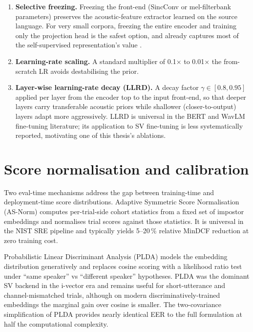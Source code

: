 \begin{enumerate}
    \item \textbf{Selective freezing.} Freezing the front-end
    (SincConv or mel-filterbank parameters) preserves the
    acoustic-feature extractor learned on the source language. For
    very small corpora, freezing the entire encoder and training
    only the projection head is the safest option, and already
    captures most of the self-supervised representation's value
    \cite{chen2022wavlm,sang2025unipet}.
    \item \textbf{Learning-rate scaling.} A standard
    multiplier of 0.1$\times$ to 0.01$\times$ the from-scratch LR
    avoids destabilising the prior.
    \item \textbf{Layer-wise learning-rate decay (LLRD).} A decay
    factor $\gamma \in [0.8, 0.95]$ applied per layer from the
    encoder top to the input front-end, so that deeper layers carry
    transferable acoustic priors while shallower (closer-to-output)
    layers adapt more aggressively. LLRD is universal in the BERT
    and WavLM fine-tuning literature; its application to SV
    fine-tuning is less systematically reported, motivating one of
    this thesis's ablations.
\end{enumerate}


\section{Score normalisation and calibration}
\label{sec:related-scoring}

Two eval-time mechanisms address the gap between training-time and
deployment-time score distributions. Adaptive Symmetric Score
Normalisation (AS-Norm) \cite{matejka2017analysis} computes
per-trial-side cohort statistics from a fixed set of impostor
embeddings and normalises trial scores against those statistics.
It is universal in the NIST SRE pipeline and typically yields
5--20\,\% relative MinDCF reduction at zero training cost.

Probabilistic Linear Discriminant Analysis (PLDA) \cite{kenny2010,
sizov2014unifying} models the embedding distribution generatively
and replaces cosine scoring with a likelihood ratio test under
``same speaker'' vs ``different speaker'' hypotheses. PLDA was the
dominant SV backend in the i-vector era and remains useful for
short-utterance and channel-mismatched trials, although on modern
discriminatively-trained embeddings the marginal gain over cosine is
smaller. The two-covariance simplification of PLDA
\cite{sizov2014unifying} provides nearly identical EER to the full
formulation at half the computational complexity.

